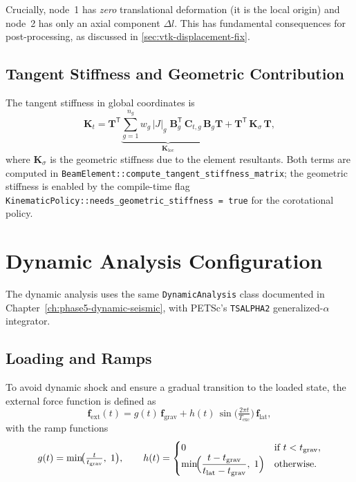 Crucially, node~1 has \emph{zero} translational deformation (it is the
local origin) and node~2 has only an axial component $\Delta l$.  This
has fundamental consequences for post-processing, as discussed in
\cref{sec:vtk-displacement-fix}.

\subsection{Tangent Stiffness and Geometric Contribution}

The tangent stiffness in global coordinates is
\begin{equation}\label{eq:corot-tangent}
  \mathbf{K}_t
  = \mathbf{T}^{\mathsf{T}} \underbrace{\sum_{g=1}^{n_g}
      w_g \, \lvert J \rvert_g \;
      \mathbf{B}_g^{\mathsf{T}} \,
      \mathbf{C}_{t,g} \,
      \mathbf{B}_g}_{\mathbf{K}_\mathrm{loc}}
    \mathbf{T}
  +
  \mathbf{T}^{\mathsf{T}} \, \mathbf{K}_\sigma \, \mathbf{T},
\end{equation}
where $\mathbf{K}_\sigma$ is the geometric stiffness due to the element
resultants.  Both terms are computed in
\texttt{BeamElement::compute\_tangent\_stiffness\_matrix}; the
geometric stiffness is enabled by the compile-time flag
\texttt{KinematicPolicy::needs\_geometric\_stiffness = true} for the
corotational policy.


\section{Dynamic Analysis Configuration}
\label{sec:corot-dynamic-config}

The dynamic analysis uses the same \texttt{DynamicAnalysis} class
documented in Chapter~\ref{ch:phase5-dynamic-seismic}, with
PETSc's \texttt{TSALPHA2} generalized-$\alpha$ integrator.

\subsection{Loading and Ramps}

To avoid dynamic shock and ensure a gradual transition to the loaded
state, the external force function is defined as
\begin{equation}\label{eq:force-function}
  \mathbf{f}_\mathrm{ext}(t)
  = g(t)\,\mathbf{f}_\mathrm{grav}
  + h(t)\,\sin\!\bigl(\tfrac{2\pi t}{T_\mathrm{exc}}\bigr)\,
    \mathbf{f}_\mathrm{lat},
\end{equation}
with the ramp functions
\begin{equation}
  g(t) = \min\!\bigl(\tfrac{t}{t_\mathrm{grav}},\; 1\bigr),
  \qquad
  h(t) = \begin{cases}
    0 & \text{if } t < t_\mathrm{grav}, \\
    \min\!\Bigl(\dfrac{t - t_\mathrm{grav}}{t_\mathrm{lat} - t_\mathrm{grav}},\; 1\Bigr) & \text{otherwise.}
  \end{cases}
\end{equation}

